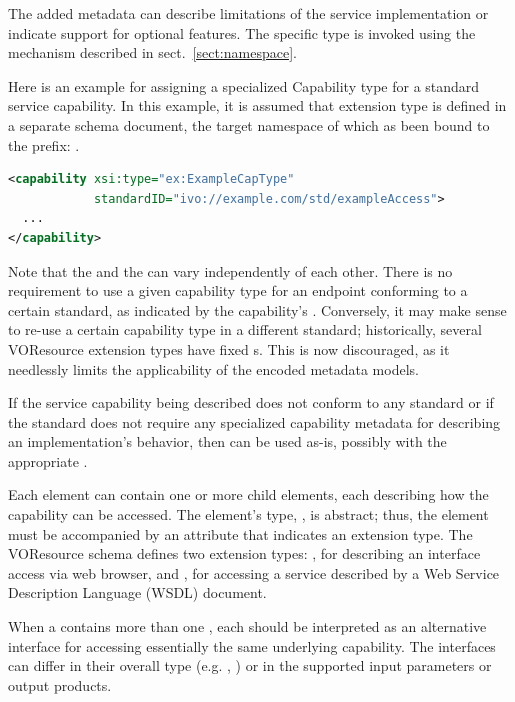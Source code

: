 \documentclass[11pt,a4paper]{ivoa}
\begin{document}
The added metadata can describe
limitations of the service implementation or indicate support for
optional features.  The specific  type is invoked
using the  mechanism described in
sect.~\ref{sect:namespace}.


Here is an example for assigning a specialized Capability type for
a standard service capability.  In this example, it is assumed that
 extension type is defined in a separate
schema document, the target namespace of which as been bound to the
 prefix:
.
\begin{lstlisting}[language=XML]
<capability xsi:type="ex:ExampleCapType"
            standardID="ivo://example.com/std/exampleAccess">
  ...
</capability>
\end{lstlisting}

Note that the  and the  can vary
independently of each other.  There is no requirement to use a given
capability type for an endpoint conforming to a certain standard, as
indicated by the capability's . Conversely,
it may make sense to re-use a certain capability type in a different
standard; historically, several VOResource extension types have
fixed s.  This is now discouraged, as it needlessly
limits the applicability of the encoded metadata models.

If the service capability being described does not conform to any
standard or if the standard does not require any specialized
capability metadata for describing an implementation's behavior, then
 can be used as-is, possibly with the appropriate
.


Each  element can contain one or more child
 elements, each describing how the capability
can be accessed.  The  element's type,
, is abstract; thus, the
 element must be accompanied by an
 attribute that indicates an
 extension type.  The VOResource schema
defines two  extension types:
, for describing an interface access via web
browser, and , for accessing a service
described by a Web Service Description Language (WSDL) document.


When a  contains more than one
, each  should be
interpreted as an alternative interface for accessing essentially the
same underlying capability.  The interfaces can differ in their
overall type (e.g. ,
) or in the supported input parameters or
output products.  
\end{document}
